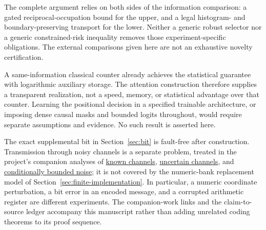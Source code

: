 \documentclass[11pt,letterpaper]{article}
\theoremstyle{definition}
\theoremstyle{remark}
\numberwithin{equation}{section}
\begin{document}
The complete argument relies on both sides of the information comparison: a gated reciprocal-occupation bound for the upper, and a legal histogram- and boundary-preserving transport for the lower. Neither a generic robust selector nor a generic constrained-risk inequality removes those experiment-specific obligations. The external comparisons given here are not an exhaustive novelty certification.

A same-information classical counter already achieves the statistical guarantee with logarithmic auxiliary storage. The attention construction therefore supplies a transparent realization, not a speed, memory, or statistical advantage over that counter. Learning the positional decision in a specified trainable architecture, or imposing dense causal masks and bounded logits throughout, would require separate assumptions and evidence. No such result is asserted here.

The exact supplemental bit in Section~\ref{sec:bit} is fault-free after construction. Transmission through noisy channels is a separate problem, treated in the project's companion analyses of
\href{https://github.com/AlexenderSokolov/transformer-icml/blob/670b7fc34ed864716124e9a56876d1baaaed6503/v10_research/resumption_20261103/RESEARCH_SUMMARY.zh.md}{known channels},
\href{https://github.com/AlexenderSokolov/transformer-icml/blob/670b7fc34ed864716124e9a56876d1baaaed6503/v10_research/channel_uncertainty_stage_20261103/RESEARCH_SUMMARY.zh.md}{uncertain channels}, and
\href{https://github.com/AlexenderSokolov/transformer-icml/blob/670b7fc34ed864716124e9a56876d1baaaed6503/v10_research/conditional_channel_20261103/CANDIDATE.md}{conditionally bounded noise}; it is not covered by the numeric-bank replacement model of Section~\ref{sec:finite-implementation}. In particular, a numeric coordinate perturbation, a bit error in an encoded message, and a corrupted arithmetic register are different experiments. The companion-work links and the claim-to-source ledger accompany this manuscript rather than adding unrelated coding theorems to its proof sequence.

\clearpage
\appendix






\clearpage
\begingroup
\raggedright


\endgroup
\end{document}
